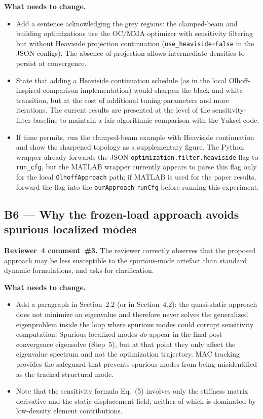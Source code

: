 \documentclass[12pt,a4paper]{article}
\begin{document}
\textbf{What needs to change.}
\begin{itemize}[leftmargin=1.6em]
  \item Add a sentence acknowledging the grey regions: the clamped-beam
        and building optimizations use the OC/MMA optimizer with sensitivity
        filtering but without Heaviside projection continuation
        (\texttt{use\_heaviside=False} in the JSON configs). The absence of
        projection allows intermediate densities to persist at convergence.
  \item State that adding a Heaviside continuation schedule (as in the
        local Olhoff-inspired comparison implementation) would sharpen the black-and-white
        transition, but at the cost of additional tuning parameters and
        more iterations. The current results are presented at the level of
        the sensitivity-filter baseline to maintain a fair algorithmic
        comparison with the Yuksel code.
  \item If time permits, run the clamped-beam example with Heaviside
        continuation and show the sharpened topology as a supplementary
        figure.  The Python wrapper already forwards the JSON
        \texttt{optimization.filter.heaviside} flag to \texttt{run\_cfg}, but
        the MATLAB wrapper currently appears to parse this flag only for the
        local \texttt{OlhoffApproach} path; if MATLAB is used for the paper results, forward the
        flag into the \texttt{ourApproach} \texttt{runCfg} before running this
        experiment.
\end{itemize}

\subsection{B6 — Why the frozen-load approach avoids spurious localized modes}

\textbf{Reviewer~4 comment~\#3.}  The reviewer correctly observes that the
proposed approach may be less susceptible to the spurious-mode artefact than
standard dynamic formulations, and asks for clarification.

\textbf{What needs to change.}
\begin{itemize}[leftmargin=1.6em]
  \item Add a paragraph in Section~2.2 (or in Section~4.2): the
        quasi-static approach does not minimize an eigenvalue and therefore
        never solves the generalized eigenproblem inside the loop where
        spurious modes could corrupt sensitivity computation. Spurious
        localized modes \emph{do} appear in the final post-convergence
        eigensolve (Step~5), but at that point they only affect the
        eigenvalue spectrum and not the optimization trajectory.  MAC
        tracking provides the safeguard that prevents spurious modes from
        being misidentified as the tracked structural mode.
  \item Note that the sensitivity formula Eq.~(5) involves only the
        stiffness matrix derivative and the static displacement field,
        neither of which is dominated by low-density element contributions.
\end{itemize}
\end{document}
